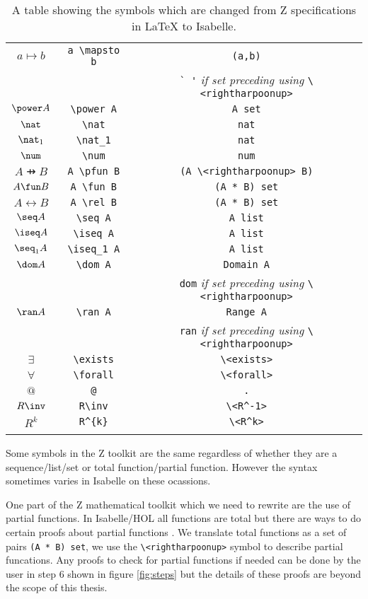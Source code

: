 {\begin{longtable}[H]{|c | c | c |}
\hline
$a \mapsto b$ & \verb|a \mapsto b| & \verb|(a,b)| \\
& & \verb|` '| \textit{if set preceding using} \verb|\<rightharpoonup>| \\
\hline
$\power A$ & \verb|\power A| & \verb|A set| \\
\hline
$\nat$ & \verb|\nat| & \verb|nat| \\
\hline
$\nat_1$ & \verb|\nat_1| & \verb|nat| \\
\hline
$\num$ & \verb|\num| & \verb|num| \\
\hline
$A \pfun B$ & \verb|A \pfun B| & \verb|(A \<rightharpoonup> B)| \\
\hline
$A \fun B$ & \verb|A \fun B| & \verb|(A * B) set| \\
\hline
$A \rel B$ & \verb|A \rel B| & \verb|(A * B) set| \\
\hline
$\seq A$ & \verb|\seq A| & \verb|A list| \\
\hline
$\iseq A$ & \verb|\iseq A| & \verb|A list| \\
\hline
$\seq_1 A$ & \verb|\iseq_1 A| & \verb|A list| \\
\hline
$\dom A$ & \verb|\dom A| & \verb|Domain A| \\
& & \verb|dom| \textit{if set preceding using} \verb|\<rightharpoonup>| \\
\hline
$\ran A$ & \verb|\ran A| & \verb|Range A| \\
& & \verb|ran| \textit{if set preceding using} \verb|\<rightharpoonup>| \\
\hline
$\exists$ & \verb|\exists| & \verb|\<exists>| \\
\hline
$\forall$ & \verb|\forall| & \verb|\<forall>| \\
\hline
$@$ & \verb|@| & \verb|.| \\
\hline
$R\inv$ & \verb|R\inv| & \verb|\<R^-1>| \\
\hline
$R^{k}$ & \verb|R^{k}| & \verb|\<R^k>| \\
\hline
\caption{A table showing the symbols which are changed from Z specifications in \LaTeX{} to Isabelle.}
\label{tab:latextoisabelle}
\end{longtable}
}

Some symbols in the Z toolkit are the same regardless of whether they are a sequence/list/set or total function/partial function. However the syntax sometimes varies in Isabelle on these ocassions.

One part of the Z mathematical toolkit which we need to rewrite are the use of partial functions. In Isabelle/HOL all functions are total but there are ways to do certain proofs about partial functions \cite{Krauss08definingrecursive}. We translate total functions as a set of pairs \verb|(A * B) set|, we use the \verb|\<rightharpoonup>| symbol to describe partial funcations. Any proofs to check for partial functions if needed can be done by the user in step 6 shown in figure \ref{fig:steps} but the details of these proofs are beyond the scope of this thesis.

